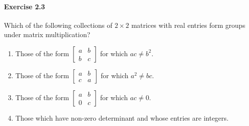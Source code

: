\documentclass[11pt]{report}
\theoremstyle{remark}
\begin{document}
    \paragraph{Exercise 2.3} Which of the following collections of $2\times 2$
    matrices with real entries form groups under matrix multiplication?
    \begin{enumerate}
        \itemsep0em
        \item Those of the form $\begin{bmatrix}
            a & b \\ b & c
        \end{bmatrix}$ for which $ac \neq b^2$.
        \item Those of the form $\begin{bmatrix}
            a & b \\ c & a
        \end{bmatrix}$ for which $a^2 \neq bc$.
        \item Those of the form $\begin{bmatrix}
            a & b \\ 0 & c
        \end{bmatrix}$ for which $ac \neq 0$.
        \item Those which have non-zero determinant and whose entries are integers.
    \end{enumerate}
\end{document}
